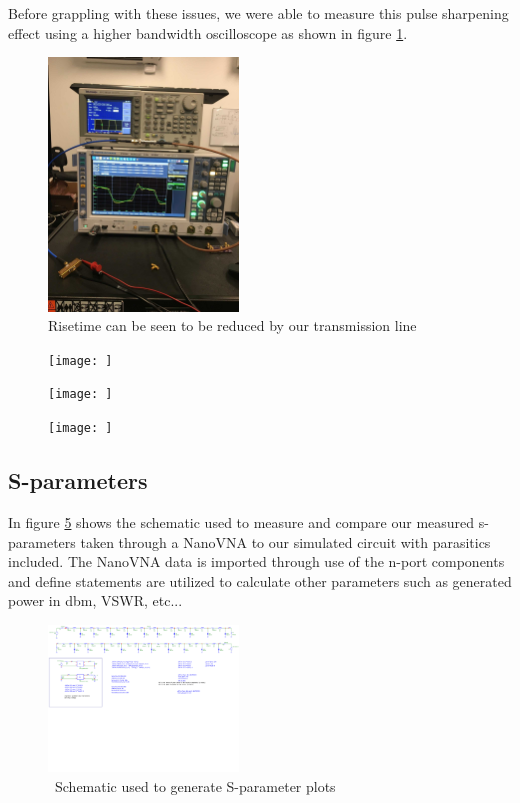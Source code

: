 \documentclass[journal]{IEEEtran}
\begin{document}
Before grappling with these issues, we were able to measure this pulse sharpening effect using a higher bandwidth oscilloscope as shown in figure \ref{fig:FirstRandS}. 


\begin{figure}[htb]
\centering
\includegraphics[width=0.45\textwidth]{Risetime_RandS}
\caption{Risetime can be seen to be reduced by our transmission line}
\label{fig:FirstRandS}
\end{figure}

\begin{figure}[htb]
\centering
\texttt{[image: ]}
\caption{}
\label{}
\end{figure}

\begin{figure}[htb]
\centering
\texttt{[image: ]}
\caption{}
\label{}
\end{figure}

\begin{figure}[htb]
\centering
\texttt{[image: ]}
\caption{}
\label{}
\end{figure}

\subsection{S-parameters}

In figure \ref{fig:sparamSchem} shows the schematic used to measure and compare our measured s-parameters taken through a NanoVNA to our simulated circuit with parasitics included. The NanoVNA data is imported through use of the n-port components and define statements are utilized to calculate other parameters such as generated power in dbm, VSWR, etc...


\begin{figure}[htb]
\centering
\includegraphics[width=0.45\textwidth,page = 1]{images/MostRecentSparamMeasSchem.pdf}
\caption{\ Schematic used to generate S-parameter plots  
}\label{fig:sparamSchem}
\end{figure}
\end{document}
